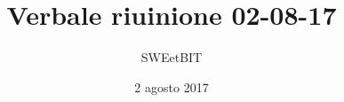 


\usepackage{ragged2e}

\title{\textbf{Verbale riuinione 02-08-17}}
\author{SWEetBIT}

\date{2 agosto 2017}




\makeFrontPage

\tableofcontents





